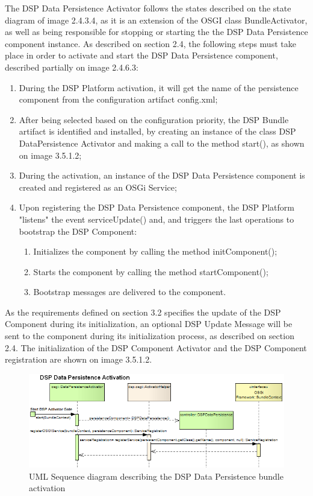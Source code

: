 The DSP Data Persistence Activator follows the states described on the state
diagram of image 2.4.3.4, as it is an extension of the OSGI class
BundleActivator, as well as being responsible for stopping or starting the the
DSP Data Persistence component instance. As described on section 2.4, the
following steps must take place in order to activate and start the DSP Data
Persistence component, described partially on image 2.4.6.3:

\begin{enumerate}
  \item During the DSP Platform activation, it will get the name of the
  persistence component from the configuration artifact config.xml;
  \item After being selected based on the configuration priority, the DSP
  Bundle artifact is identified and installed, by creating an instance of the
  class DSP DataPersistence Activator and making a call to the method start(),
  as shown on image 3.5.1.2;
  \item During the activation, an instance of the DSP Data Persistence
  component is created and registered as an OSGi Service;
  \item Upon registering the DSP Data Persistence component, the DSP Platform
  "listens" the event serviceUpdate() and, and triggers the last operations to
  bootstrap the DSP Component:
   \begin{enumerate}
      \item Initializes the component by calling the method initComponent();
      \item Starts the component by calling the method startComponent();
      \item Bootstrap messages are delivered to the component.
   \end{enumerate}
\end{enumerate}

As the requirements defined on section 3.2 specifies the update of the DSP
Component during its initialization, an optional DSP Update Message will be
sent to the component during its initialization process, as described on
section 2.4. The initialization of the DSP Component Activator and the DSP
Component registration are shown on image 3.5.1.2.

\begin{figure}[!b]
  \centering
  \includegraphics[scale=0.5]{../diagrams/From-OSGi-Framework-to-DSP-Data-PersistenceActivator-Sequence-Diagram}
  \caption{UML Sequence diagram describing the DSP Data Persistence bundle activation}
  \label{fig:From-OSGi-Framework-to-DSP-Data-PersistenceActivator-Sequence-Diagram}
\end{figure}

